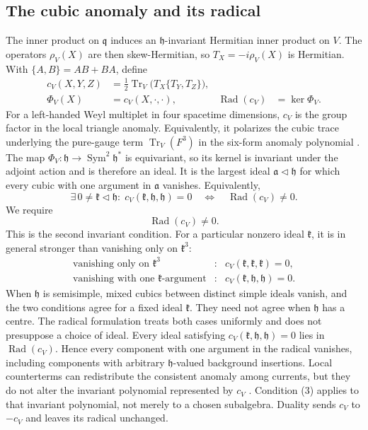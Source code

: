 \documentclass[11pt]{article}
\theoremstyle{remark}
\newcommand{\h}{\mathfrak h}
\newcommand{\q}{\mathfrak q}
\newcommand{\Tr}{\operatorname{Tr}}
\newcommand{\Rad}{\operatorname{Rad}}
\begin{document}
\subsection{The cubic anomaly and its radical}

The inner product on \(\q\) induces an \(\h\)-invariant Hermitian inner
product on \(V\). The operators \(\rho_V(X)\) are then skew-Hermitian,
so \(T_X=-i\rho_V(X)\) is Hermitian. With
\(\{A,B\}=AB+BA\), define
\[
\begin{aligned}
 c_V(X,Y,Z)&=\frac12\Tr_V\!\bigl(T_X\{T_Y,T_Z\}\bigr),\\
 \Phi_V(X)&=c_V(X,\cdot,\cdot),
 &\Rad(c_V)&=\ker\Phi_V.
\end{aligned}                                                       \tag{2}
\]
For a left-handed Weyl multiplet in four spacetime dimensions, \(c_V\)
is the group factor in the local triangle anomaly. Equivalently, it
polarizes the cubic trace underlying the pure-gauge term
\(\Tr_V(F^3)\) in the six-form anomaly polynomial
\cite{AlvarezGaumeGinsparg}.
The map \(\Phi_V:\h\to\operatorname{Sym}^2\h^*\) is equivariant, so
its kernel is invariant under the adjoint action and is therefore an
ideal. It is the largest ideal \(\mathfrak a\triangleleft\h\) for which
every cubic with one argument in \(\mathfrak a\) vanishes. Equivalently,
\[
 \exists\,0\ne\mathfrak k\triangleleft\h:\;
 c_V(\mathfrak k,\h,\h)=0
 \quad\Longleftrightarrow\quad \Rad(c_V)\ne0.
\]
We require
\[
                         \Rad(c_V)\ne0. \tag{3}
\]
This is the second invariant condition. For a
particular nonzero ideal \(\mathfrak k\), it is in general stronger than vanishing
only on \(\mathfrak k^3\):
\[
\begin{array}{rcl}
\text{vanishing only on \(\mathfrak k^3\)}&:&
c_V(\mathfrak k,\mathfrak k,\mathfrak k)=0,\\[1mm]
\text{vanishing with one \(\mathfrak k\)-argument}&:&
c_V(\mathfrak k,\h,\h)=0.
\end{array}                                                        \tag{4}
\]
When \(\h\) is semisimple, mixed cubics between distinct simple ideals
vanish, and the two conditions agree for a fixed ideal \(\mathfrak k\).
They need not agree when \(\h\) has a centre. The radical formulation
treats both cases uniformly and does not presuppose a choice of ideal.
Every ideal satisfying \(c_V(\mathfrak k,\h,\h)=0\) lies in
\(\Rad(c_V)\). Hence every component with one
argument in the radical vanishes, including components with arbitrary
\(\h\)-valued background insertions. Local counterterms can redistribute the
consistent anomaly among currents, but they do not alter the invariant
polynomial represented by \(c_V\) \cite{AlvarezGaumeGinsparg}. Condition (3)
applies to that invariant polynomial, not merely to a chosen subalgebra.
Duality sends \(c_V\) to \(-c_V\) and leaves its radical unchanged.
\end{document}
